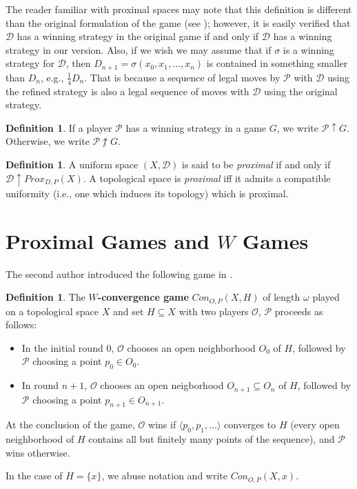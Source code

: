 \documentclass{amsart}
\theoremstyle{definition}
\newtheorem{defn}[thm]{Definition}
\theoremstyle{remark}
\newcommand{\<}{\langle}
\renewcommand{\>}{\rangle}
\newcommand{\proxgame}[1]{Prox_{D,P}(#1)}
\newcommand{\congame}[2]{Con_{O,P}(#1,#2)}
\newcommand{\pl}[1]{\mathscr{#1}}
\newcommand{\win}{\uparrow}
\newcommand{\term}{\textit}
\begin{document}
The reader familiar with proximal spaces may note that this definition is different than the original formulation of the game (see \cite{b}); however, it is easily verified that $\pl D$ has a winning strategy in the original game if and only if $\pl D$ has a winning strategy in our version.   Also, if we wish we may assume that if $\sigma$ is a winning strategy for $\pl D$, then $D_{n+1}=\sigma (x_0,x_1,...,x_n)$ is contained in something smaller than $D_n$, e.g., $\frac{1}{4}D_n$.  That is because a sequence of legal moves by $\pl P$ with $\pl D$ using the refined strategy is also a legal sequence of moves with $\pl D$ using the original strategy.

\begin{defn}
  If a player $\pl P$ has a winning strategy in a game $G$, we write $\pl P\win G$. Otherwise, we write $\pl P\not\win G$.
\end{defn}

\begin{defn}
  A uniform space $(X,\mathcal D)$ is said to be \term{proximal} if and only if $\pl D\win\proxgame{X}$.  A topological space is \term{proximal} iff it admits  a compatible uniformity (i.e., one which induces its topology) which is proximal.
\end{defn}

\section{Proximal Games and $W$ Games}

The second author introduced the following game in \cite{ginfinite}.

\begin{defn}
  The \textbf{$W$-convergence game} $\congame{X}{H}$ of length $\omega$ played on a topological space $X$ and set $H\subseteq X$ with two players $\pl O$, $\pl P$ proceeds as follows:
    \begin{itemize}
      \item In the initial round $0$, $\pl O$ chooses an open neighborhood $O_0$ of $H$, followed by $\pl P$ choosing a point $p_0\in O_0$.
      \item In round $n+1$, $\pl O$ chooses an open neigborhood $O_{n+1}\subseteq O_n$ of $H$, followed by $\pl P$ choosing a point $p_{n+1}\in O_{n+1}$.
    \end{itemize}
  At the conclusion of the game, $\pl O$ wins if $\<p_0,p_1,\dots\>$ converges to $H$ (every open neighborhood of $H$ contains all but finitely many points of the sequence), and $\pl P$ wins otherwise.

  In the case of $H=\{x\}$, we abuse notation and write $\congame{X}{x}$.
\end{defn}
\end{document}
